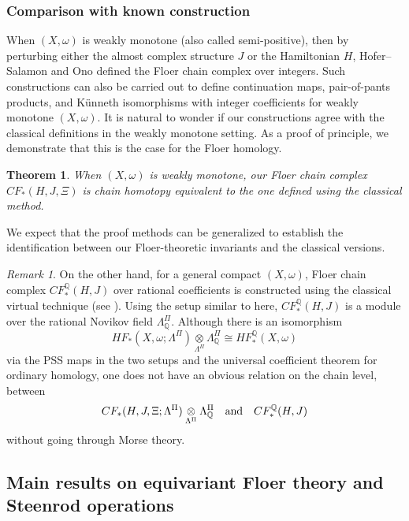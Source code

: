 \documentclass[reqno, 10pt]{amsart}
\numberwithin{equation}{section}
\numberwithin{equation}{section}
\newtheorem{thma}{Theorem}
\theoremstyle{definition}
\theoremstyle{remark}
\newtheorem{rem}[thm]{Remark}
\newcommand{\beqn}{\begin{equation*}}
\newcommand{\eeqn}{\end{equation*}}
\newcommand{\mb}{\mathbb}
\begin{document}
\subsubsection{Comparison with known construction}

When $(X, \omega)$ is weakly monotone (also called semi-positive), then by perturbing either the almost complex structure $J$ or the Hamiltonian $H$, Hofer--Salamon \cite{Hofer_Salamon} and Ono \cite{Ono_1995} defined the Floer chain complex over integers. Such constructions can also be carried out to define continuation maps, pair-of-pants products, and K\"unneth isomorphisms with integer coefficients for weakly monotone $(X, \omega)$. It is natural to wonder if our constructions agree with the classical definitions in the weakly monotone setting. As a proof of principle, we demonstrate that this is the case for the Floer homology.

\begin{thma}\label{thma_semipositive}
When $(X, \omega)$ is weakly monotone, our Floer chain complex $CF_*(H, J, \Xi)$ is chain homotopy equivalent to the one defined using the classical method.
\end{thma}
 

We expect that the proof methods can be generalized to establish the identification between our Floer-theoretic invariants and the classical versions. 


\begin{rem}
On the other hand, for a general compact $(X, \omega)$, Floer chain complex $CF_*^{\mb Q}(H, J)$ over rational coefficients is constructed using the classical virtual technique (see \cite{Liu_Tian_Floer}\cite{Fukaya_Ono}\cite{Pardon_virtual}). Using the setup similar to here, $CF_*^{\mb Q}(H, J)$ is a module over the rational Novikov field $\Lambda_{\mb Q}^\Pi$. Although there is an isomorphism
\beqn
HF_*(X, \omega; \Lambda^\Pi) \underset{\Lambda^\Pi}{\otimes} \Lambda_{\mb Q}^\Pi \cong HF_*^{\mb Q}(X, \omega)
\eeqn
via the PSS maps in the two setups and the universal coefficient theorem for ordinary homology, one does not have an obvious relation on the chain level, between
\beqn
CF_*(H, J, \Xi; \Lambda^\Pi) \underset{\Lambda^\Pi}{\otimes} \Lambda_{\mb Q}^\Pi\ \ \ {\rm and}\ \ \ CF_*^{\mb Q}(H, J)
\eeqn
without going through Morse theory.
\end{rem}



\subsection{Main results on equivariant Floer theory and Steenrod operations}
\end{document}
